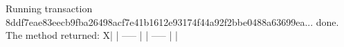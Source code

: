 \begin{shellbox}\begin{ttlst}
Running transaction 8ddf7eae83eecb9fba26498acf7e41b1612e93174f44a92f2bbe0488a63699ea... done.
The method returned:
X| | 
-----
 | | 
-----
 | | 
\end{ttlst}\end{shellbox}

